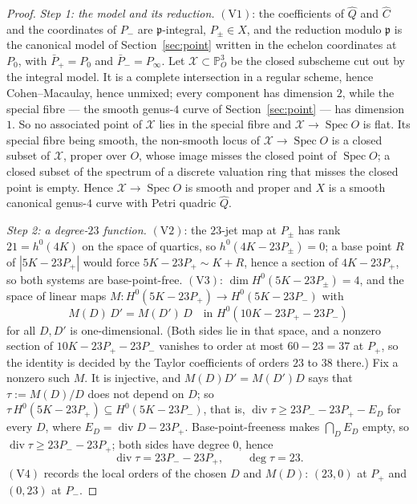 \documentclass[11pt]{amsart}
\newcommand{\PP}{\mathbb{P}}
\newcommand{\Spec}{\operatorname{Spec}}
\newcommand{\pp}{\mathfrak p}
\newcommand{\Xs}{\mathscr X}
\theoremstyle{plain}
\theoremstyle{definition}
\begin{document}
\begin{proof}
\emph{Step 1: the model and its reduction.} $(\mathrm V1)$: the
coefficients of $\hat Q$ and $\hat C$ and the coordinates of $P_-$ are
$\pp$-integral, $P_\pm\in X$, and the reduction modulo $\pp$ is the
canonical model of Section~\ref{sec:point} written in the echelon
coordinates at $P_0$, with $\bar P_+=P_0$ and $\bar P_-=P_\infty$. Let
$\Xs\subset\PP^3_O$ be the closed subscheme cut out by the integral
model. It is a complete intersection in a regular scheme, hence
Cohen--Macaulay, hence unmixed; every component has dimension $2$,
while the special fibre --- the smooth genus-$4$ curve of
Section~\ref{sec:point} --- has dimension $1$. So no associated point
of $\Xs$ lies in the special fibre and $\Xs\to\Spec O$ is flat. Its
special fibre being smooth, the non-smooth locus of $\Xs\to\Spec O$ is
a closed subset of $\Xs$, proper over $O$, whose image misses the
closed point of $\Spec O$; a closed subset of the spectrum of a
discrete valuation ring that misses the closed point is empty. Hence
$\Xs\to\Spec O$ is smooth and proper and $X$ is a smooth canonical
genus-$4$ curve with Petri quadric $\hat Q$.

\emph{Step 2: a degree-$23$ function.} $(\mathrm V2)$: the $23$-jet
map at $P_\pm$ has rank $21=h^0(4K)$ on the space of quartics, so
$h^0(4K-23P_\pm)=0$; a base point $R$ of $|5K-23P_+|$ would force
$5K-23P_+\sim K+R$, hence a section of $4K-23P_+$, so both systems are
base-point-free. $(\mathrm V3)$: $\dim H^0(5K-23P_\pm)=4$, and the
space of linear maps
$M\colon H^0(5K-23P_+)\to H^0(5K-23P_-)$ with
\[
  M(D)\,D'=M(D')\,D\quad\text{in }H^0(10K-23P_+-23P_-)
\]
for all $D,D'$ is one-dimensional. (Both sides lie in that space, and
a nonzero section of $10K-23P_+-23P_-$ vanishes to order at most
$60-23=37$ at $P_+$, so the identity is decided by the Taylor
coefficients of orders $23$ to $38$ there.) Fix a nonzero such $M$. It
is injective, and $M(D)D'=M(D')D$ says that $\tau:=M(D)/D$ does not
depend on $D$; so $\tau\,H^0(5K-23P_+)\subseteq H^0(5K-23P_-)$, that
is, $\operatorname{div}\tau\ge23P_--23P_+-E_D$ for every $D$, where
$E_D=\operatorname{div}D-23P_+$. Base-point-freeness makes
$\bigcap_DE_D$ empty, so $\operatorname{div}\tau\ge23P_--23P_+$; both
sides have degree $0$, hence
\[
  \operatorname{div}\tau=23P_--23P_+,\qquad \deg\tau=23 .
\]
$(\mathrm V4)$ records the local orders of the chosen $D$ and $M(D)$:
$(23,0)$ at $P_+$ and $(0,23)$ at $P_-$.


\end{proof}
\end{document}
